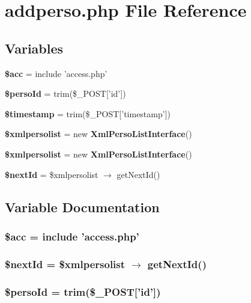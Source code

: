 \section{addperso.php File Reference}
\label{addperso_8php}


\subsection*{Variables}
\begin{CompactItemize}
\item 
{\bf \$acc} = include 'access.php'
\item 
{\bf \$perso\-Id} = trim(\$\_\-POST['id'])
\item 
{\bf \$timestamp} = trim(\$\_\-POST['timestamp'])
\item 
{\bf \$xmlpersolist} = new {\bf Xml\-Perso\-List\-Interface}()
\item 
{\bf \$xmlpersolist} = new {\bf Xml\-Perso\-List\-Interface}()
\item 
{\bf \$next\-Id} = \$xmlpersolist $\rightarrow$ get\-Next\-Id()
\end{CompactItemize}


\subsection{Variable Documentation}
\subsubsection{\setlength{\rightskip}{0pt plus 5cm}\$acc = include 'access.php'}\label{addperso_8php_542926c588a05eb69553d79c83cf73da}


\subsubsection{\setlength{\rightskip}{0pt plus 5cm}\$next\-Id = \$xmlpersolist $\rightarrow$ get\-Next\-Id()}\label{addperso_8php_07c31c1eddcdd711412e55a018ee344c}


\subsubsection{\setlength{\rightskip}{0pt plus 5cm}\$perso\-Id = trim(\$\_\-POST['id'])}\label{addperso_8php_2369d5f79f5a5a70747edb815cc2ddeb}



